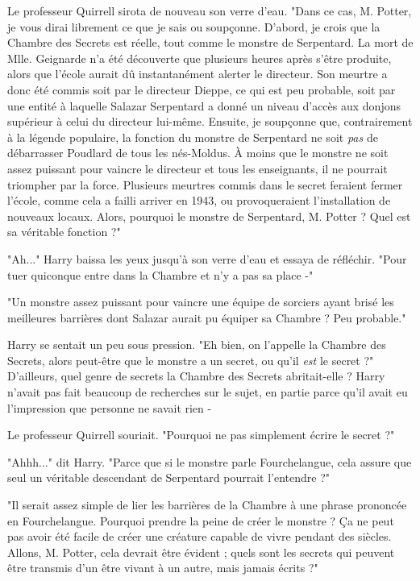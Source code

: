 Le professeur Quirrell sirota de nouveau son verre d'eau. "Dans ce cas, M. Potter, je vous dirai librement ce que je sais ou soupçonne. D'abord, je crois que la Chambre des Secrets est réelle, tout comme le monstre de Serpentard. La mort de Mlle. Geignarde n'a été découverte que plusieurs heures après s'être produite, alors que l'école aurait dû instantanément alerter le directeur. Son meurtre a donc été commis soit par le directeur Dieppe, ce qui est peu probable, soit par une entité à laquelle Salazar Serpentard a donné un niveau d'accès aux donjons supérieur à celui du directeur lui-même. Ensuite, je soupçonne que, contrairement à la légende populaire, la fonction du monstre de Serpentard ne soit \emph{pas}  de débarrasser Poudlard de tous les nés-Moldus. À moins que le monstre ne soit assez puissant pour vaincre le directeur et tous les enseignants, il ne pourrait triompher par la force. Plusieurs meurtres commis dans le secret feraient fermer l'école, comme cela a failli arriver en 1943, ou provoqueraient l'installation de nouveaux locaux. Alors, pourquoi le monstre de Serpentard, M. Potter ? Quel est sa véritable fonction ?"

"Ah..." Harry baissa les yeux jusqu'à son verre d'eau et essaya de réfléchir. "Pour tuer quiconque entre dans la Chambre et n'y a pas sa place -"

"Un monstre assez puissant pour vaincre une équipe de sorciers ayant brisé les meilleures barrières dont Salazar aurait pu équiper sa Chambre ? Peu probable."

Harry se sentait un peu sous pression. "Eh bien, on l'appelle la Chambre des Secrets, alors peut-être que le monstre a un secret, ou qu'il \emph{est}  le secret ?" D'ailleurs, quel genre de secrets la Chambre des Secrets abritait-elle ? Harry n'avait pas fait beaucoup de recherches sur le sujet, en partie parce qu'il avait eu l'impression que personne ne savait rien -

Le professeur Quirrell souriait. "Pourquoi ne pas simplement écrire le secret ?"

"Ahhh..." dit Harry. "Parce que si le monstre parle Fourchelangue, cela assure que seul un véritable descendant de Serpentard pourrait l'entendre ?"

"Il serait assez simple de lier les barrières de la Chambre à une phrase prononcée en Fourchelangue. Pourquoi prendre la peine de créer le monstre ? Ça ne peut pas avoir été facile de créer une créature capable de vivre pendant des siècles. Allons, M. Potter, cela devrait être évident ; quels sont les secrets qui peuvent être transmis d'un être vivant à un autre, mais jamais écrits ?"

